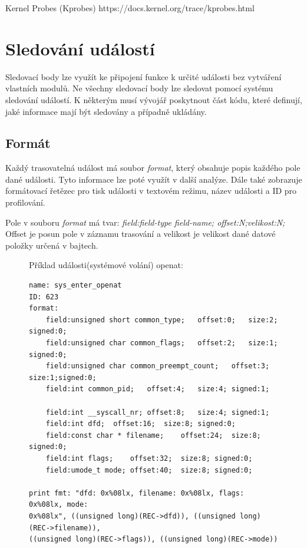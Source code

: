 Kernel Probes (Kprobes)
https://docs.kernel.org/trace/kprobes.html
\fi



\section{Sledování událostí}
\label{sec:SledovaniUdalosti}

Sledovací body lze využít ke připojení funkce k určité události\cite{EventTracing} bez vytváření vlastních modulů. Ne všechny sledovací body lze sledovat pomocí systému sledování událostí. K některým musí vývojář poskytnout část kódu, které definují, jaké informace mají být sledovány a případně ukládány.

\subsection*{Formát}
Každý trasovatelná událost má soubor \emph{format}, který obsahuje popis každého pole dané události. Tyto informace lze poté využít v další
analýze. Dále také zobrazuje formátovací řetězec pro tisk události v textovém režimu, název události a ID pro profilování.

Pole v souboru \emph{format} má tvar:
\emph{field:field-type field-name; offset:N;velikost:N;}
Offset je posun pole v záznamu trasování a velikost je velikost dané datové položky určená v bajtech.

\begin{figure}[H]
Příklad události(systémové volání) openat:
\begin{verbatim}
name: sys_enter_openat
ID: 623
format:
    field:unsigned short common_type;	offset:0;	size:2;	signed:0;
    field:unsigned char common_flags;	offset:2;	size:1;	signed:0;
    field:unsigned char common_preempt_count;	offset:3;	size:1;signed:0;
    field:int common_pid;	offset:4;	size:4;	signed:1;

    field:int __syscall_nr;	offset:8;	size:4;	signed:1;
    field:int dfd;	offset:16;	size:8;	signed:0;
    field:const char * filename;	offset:24;	size:8;	signed:0;
    field:int flags;	offset:32;	size:8;	signed:0;
    field:umode_t mode;	offset:40;	size:8;	signed:0;

print fmt: "dfd: 0x%08lx, filename: 0x%08lx, flags: 0x%08lx, mode:
0x%08lx", ((unsigned long)(REC->dfd)), ((unsigned long)(REC->filename)),
((unsigned long)(REC->flags)), ((unsigned long)(REC->mode))
\end{verbatim}
\end{figure}

